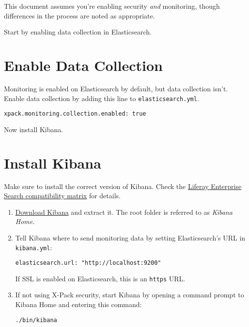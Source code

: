 This document assumes you're enabling security \emph{and} monitoring,
though differences in the process are noted as appropriate.

Start by enabling data collection in Elasticsearch.

\section{Enable Data Collection}\label{enable-data-collection}

Monitoring is enabled on Elasticsearch by default, but data collection
isn't. Enable data collection by adding this line to
\texttt{elasticsearch.yml}.

\begin{verbatim}
xpack.monitoring.collection.enabled: true
\end{verbatim}

Now install Kibana.

\section{Install Kibana}\label{install-kibana}

Make sure to install the correct version of Kibana. Check the
\href{https://web.liferay.com/group/customer/dxp/support/compatibility-matrix/enterprise-search}{Liferay
Enterprise Search compatibility matrix} for details.

\begin{enumerate}
\def\labelenumi{\arabic{enumi}.}
\item
  \href{https://www.elastic.co/downloads/kibana}{Download Kibana} and
  extract it. The root folder is referred to as \emph{Kibana Home}.
\item
  Tell Kibana where to send monitoring data by setting Elasticsearch's
  URL in \texttt{kibana.yml}:

\begin{verbatim}
elasticsearch.url: "http://localhost:9200"
\end{verbatim}

  If SSL is enabled on Elasticsearch, this is an \texttt{https} URL.
\item
  If not using X-Pack security, start Kibana by opening a command prompt
  to Kibana Home and entering this command:

\begin{verbatim}
./bin/kibana
\end{verbatim}
\end{enumerate}

